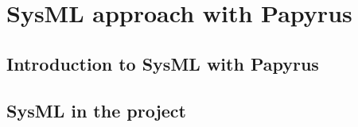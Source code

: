 
\section{SysML approach with Papyrus}

\subsection{Introduction to SysML with Papyrus}

\begin{comment}
short introduction to sysML language with references to  OMg specification and major document which describe it + short description of main concepts of SysML +  short description of particularities of SysML on papyrus. (parts of 07.1.3\_O7.1.7 may be reused). 
\end{comment}

\subsection{SysML in the project}

